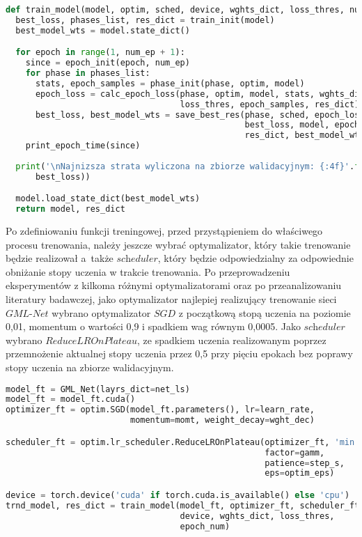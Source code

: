 \cell
\begin{lstlisting}[name=Rozdzial3.1, language=Python]
def train_model(model, optim, sched, device, wghts_dict, loss_thres, num_ep):
  best_loss, phases_list, res_dict = train_init(model)
  best_model_wts = model.state_dict()

  for epoch in range(1, num_ep + 1):
    since = epoch_init(epoch, num_ep)
    for phase in phases_list:
      stats, epoch_samples = phase_init(phase, optim, model)
      epoch_loss = calc_epoch_loss(phase, optim, model, stats, wghts_dict, 
                                   loss_thres, epoch_samples, res_dict)
      best_loss, best_model_wts = save_best_res(phase, sched, epoch_loss, 
                                                best_loss, model, epoch, 
                                                res_dict, best_model_wts)
    print_epoch_time(since)
    
  print('\nNajnizsza strata wyliczona na zbiorze walidacyjnym: {:4f}'.format(
      best_loss))

  model.load_state_dict(best_model_wts)
  return model, res_dict
\end{lstlisting}


\cell
Po zdefiniowaniu funkcji treningowej, przed przystąpieniem do właściwego procesu trenowania, należy jeszcze wybrać optymalizator, który takie trenowanie będzie realizował a~także $\textit{scheduler}$, który będzie odpowiedzialny za odpowiednie obniżanie stopy uczenia w trakcie trenowania. Po przeprowadzeniu eksperymentów z kilkoma różnymi optymalizatorami oraz po przeanalizowaniu literatury badawczej, jako optymalizator najlepiej realizujący trenowanie sieci $\textit{GML-Net}$ wybrano optymalizator $\textit{SGD}$ z początkową stopą uczenia na poziomie 0,01, momentum o wartości 0,9 i spadkiem wag równym 0,0005. Jako $\textit{scheduler}$ wybrano $\textit{ReduceLROnPlateau}$, ze spadkiem uczenia realizowanym poprzez przemnożenie aktualnej stopy uczenia przez 0,5 przy pięciu epokach bez poprawy stopy uczenia na zbiorze walidacyjnym.

\cell
\begin{lstlisting}[name=Rozdzial3.1, language=Python]
model_ft = GML_Net(layrs_dict=net_ls)
model_ft = model_ft.cuda()
optimizer_ft = optim.SGD(model_ft.parameters(), lr=learn_rate, 
                         momentum=momt, weight_decay=wght_dec)

scheduler_ft = optim.lr_scheduler.ReduceLROnPlateau(optimizer_ft, 'min', 
                                                    factor=gamm, 
                                                    patience=step_s, 
                                                    eps=optim_eps)

device = torch.device('cuda' if torch.cuda.is_available() else 'cpu')
trnd_model, res_dict = train_model(model_ft, optimizer_ft, scheduler_ft, 
                                   device, wghts_dict, loss_thres, 
                                   epoch_num)
\end{lstlisting}


